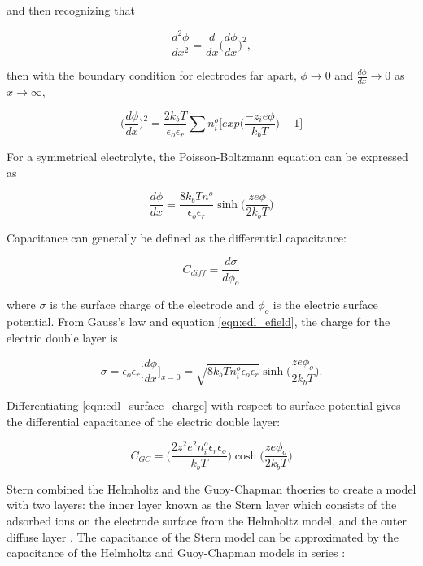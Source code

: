 \noindent and then recognizing that

\begin{equation}
    \frac{d^2\phi}{dx^2} = \frac{d}{dx}\Big(\frac{d\phi}{dx}\Big)^2,
\end{equation}

\noindent then with the boundary condition for electrodes far apart, $\phi\to0$ and $\frac{d\phi}{dx}\to 0$ as $x\to\infty$,

\begin{equation}
    \Big(\frac{d\phi}{dx}\Big)^2 = \frac{2k_b T}{\epsilon_o\epsilon_r} \sum n_i^o \bigg[exp\Big(\frac{-z_i e\phi}{k_b T}\Big) - 1\bigg] 
\end{equation}

\par For a symmetrical electrolyte, the Poisson-Boltzmann equation can be expressed as

\begin{equation}
    \frac{d\phi}{dx} = \frac{8k_bTn^o}{\epsilon_o\epsilon_r}\sinh\Big(\frac{ze\phi}{2k_bT}\Big)
    \label{eqn:edl_efield}
\end{equation}

\par Capacitance can generally be defined as the differential capacitance:

\begin{equation}
    C_{diff} = \frac{d\sigma}{d\phi_o}
\end{equation}

\noindent where $\sigma$ is the surface charge of the electrode and $\phi_o$ is the electric surface potential. From Gauss's law and equation \ref{eqn:edl_efield}, the charge for the electric double layer is

\begin{equation}
    \sigma = \epsilon_o\epsilon_r \Big[\frac{d\phi}{dx}\Big]_{x=0} = \sqrt{8k_bTn_i^o\epsilon_o\epsilon_r}\sinh\Big(\frac{ze\phi_o}{2k_bT}\Big).
    \label{eqn:edl_surface_charge}
\end{equation}

\noindent Differentiating \ref{eqn:edl_surface_charge} with respect to surface potential gives the differential capacitance of the electric double layer:

\begin{equation}
    C_{GC} = \Big(\frac{2z^2e^2n_i^o\epsilon_r\epsilon_o}{k_bT}\Big)\cosh\Big(\frac{ze\phi_o}{2k_bT}\Big)
\end{equation}

\par Stern combined the Helmholtz and the Guoy-Chapman thoeries to create a model with two layers: the inner layer known as the Stern layer which consists of the adsorbed ions on the electrode surface from the Helmholtz model, and the outer diffuse layer \cite{_jes2011.pdf_????}. The capacitance of the Stern model can be approximated by the capacitance of the Helmholtz and Guoy-Chapman models in series \cite{_gongadze.pdf_????}:

